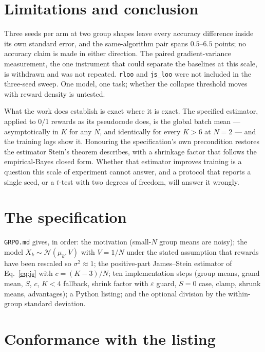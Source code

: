 \documentclass{article}
\newcommand{\arm}[1]{\texttt{#1}}
\begin{document}
\section{Limitations and conclusion}

Three seeds per arm at two group shapes leave every accuracy difference
inside its own standard error, and the same-algorithm pair spans $0.5$--$6.5$
points; no accuracy claim is made in either direction. The paired
gradient-variance measurement, the one instrument that could separate the
baselines at this scale, is withdrawn and was not repeated. \arm{rloo} and
\arm{js\_loo} were not included in the three-seed sweep. One model, one
task; whether the collapse threshold moves with reward density is untested.

What the work does establish is exact where it is exact. The specified
estimator, applied to $0/1$ rewards as its pseudocode does, is the global
batch mean --- asymptotically in $K$ for any $N$, and identically for every
$K>6$ at $N=2$ --- and the training logs show it. Honouring the
specification's own precondition restores the estimator Stein's theorem
describes, with a shrinkage factor that follows the empirical-Bayes closed
form. Whether that estimator improves training is a question this scale of
experiment cannot answer, and a protocol that reports a single seed, or a
$t$-test with two degrees of freedom, will answer it wrongly.




\appendix

\section{The specification}
\label{app:spec}

\texttt{GRPO.md} gives, in order: the motivation (small-$N$ group means are
noisy); the model $X_k\sim\mathcal N(\mu_k,V)$ with $V=1/N$ under the
stated assumption that rewards have been rescaled so $\sigma^2\approx1$;
the positive-part James--Stein estimator of Eq.~\eqref{eq:js} with
$c=(K-3)/N$; ten implementation steps (group means, grand mean, $S$, $c$,
$K<4$ fallback, shrink factor with $\varepsilon$ guard, $S=0$ case, clamp,
shrunk means, advantages); a Python listing; and the optional division by
the within-group standard deviation.

\section{Conformance with the listing}
\label{app:conformance}
\end{document}
